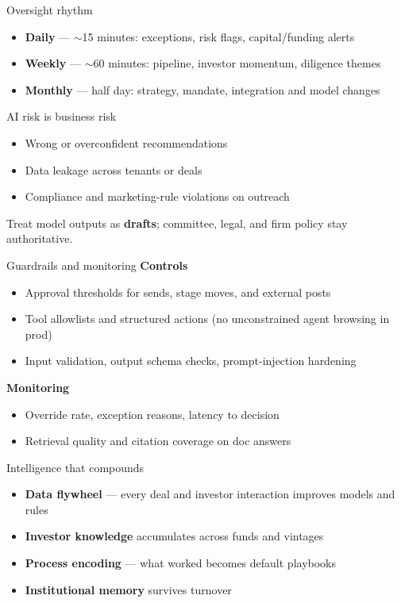 \documentclass[aspectratio=169,11pt]{beamer}
\begin{document}
\begin{frame}{Oversight rhythm}
  \begin{itemize}
    \item \textbf{Daily} --- $\sim$15 minutes: exceptions, risk flags, capital/funding alerts
    \item \textbf{Weekly} --- $\sim$60 minutes: pipeline, investor momentum, diligence themes
    \item \textbf{Monthly} --- half day: strategy, mandate, integration and model changes
  \end{itemize}
\end{frame}

\begin{frame}{AI risk is business risk}
  \small
  \begin{itemize}
    \item Wrong or overconfident recommendations
    \item Data leakage across tenants or deals
    \item Compliance and marketing-rule violations on outreach
  \end{itemize}
  Treat model outputs as \textbf{drafts}; committee, legal, and firm policy stay authoritative.
\end{frame}

\begin{frame}{Guardrails and monitoring}
  \small
  \textbf{Controls}
  \begin{itemize}
    \item Approval thresholds for sends, stage moves, and external posts
    \item Tool allowlists and structured actions (no unconstrained agent browsing in prod)
    \item Input validation, output schema checks, prompt-injection hardening
  \end{itemize}
  \textbf{Monitoring}
  \begin{itemize}
    \item Override rate, exception reasons, latency to decision
    \item Retrieval quality and citation coverage on doc answers
  \end{itemize}
\end{frame}

\begin{frame}{Intelligence that compounds}
  \begin{itemize}
    \item \textbf{Data flywheel} --- every deal and investor interaction improves models and rules
    \item \textbf{Investor knowledge} accumulates across funds and vintages
    \item \textbf{Process encoding} --- what worked becomes default playbooks
    \item \textbf{Institutional memory} survives turnover
  \end{itemize}
\end{frame}
\end{document}
